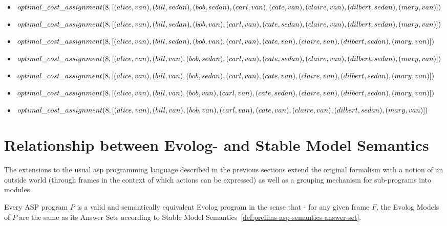 \begin{itemize}
	\item $optimal\_cost\_assignment(8, [(alice, van), (bill, sedan), (bob, sedan), (carl, van),\\(cate, van), (claire, van), (dilbert, sedan), (mary, van)])$
	\item $optimal\_cost\_assignment(8, [(alice, van), (bill, sedan), (bob, van), (carl, van),\\(cate, sedan), (claire, van), (dilbert, sedan), (mary, van)])$
	\item $optimal\_cost\_assignment(8, [(alice, van), (bill, sedan), (bob, van), (carl, van),\\(cate, van), (claire, van), (dilbert, sedan), (mary, van)])$
	\item $optimal\_cost\_assignment(8, [(alice, van), (bill, van), (bob, sedan), (carl, van),\\(cate, sedan), (claire, van), (dilbert, sedan), (mary, van)])$
	\item $optimal\_cost\_assignment(8, [(alice, van), (bill, van), (bob, sedan), (carl, van),\\(cate, van), (claire, van), (dilbert, sedan), (mary, van)])$
	\item $optimal\_cost\_assignment(8, [(alice, van), (bill, van), (bob, van), (carl, van),\\(cate, sedan), (claire, van), (dilbert, sedan), (mary, van)])$
	\item $optimal\_cost\_assignment(8, [(alice, van), (bill, van), (bob, van), (carl, van),\\(cate, van), (claire, van), (dilbert, sedan), (mary, van)])$
\end{itemize}



\section{Relationship between Evolog- and Stable Model Semantics}

The extensions to the usual \gls{asp} programming language described in the previous sections extend the original formalism with a notion of an outside world (through frames in the context of which actions can be expressed) as well as a grouping mechanism for sub-programs into modules.

\begin{theorem}[Extension]
\label{thm:extension}
Every ASP program $P$ is a valid and semantically equivalent Evolog program in the sense that - for any given frame $F$, the Evolog Models of $P$ are the same as its Answer Sets according to Stable Model Semantics~\ref{def:prelims-asp-semantics-answer-set}.
\end{theorem}

